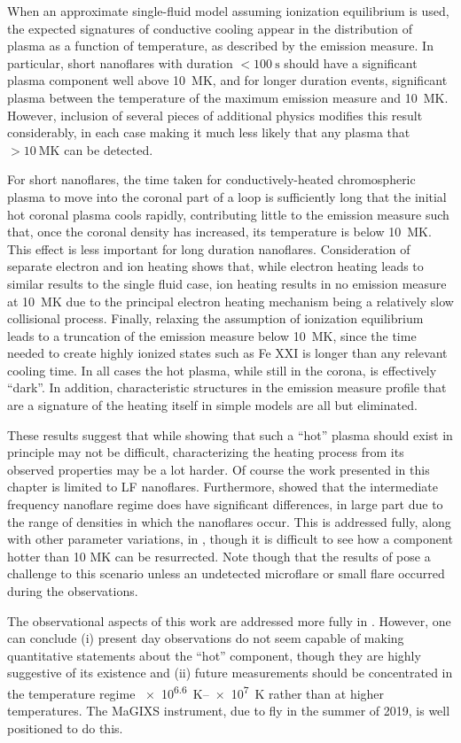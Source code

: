 When an approximate single-fluid model assuming ionization equilibrium is used, the expected signatures of conductive cooling appear in the distribution of plasma as a function of temperature, as described by the emission measure. In particular, short nanoflares with duration $<\SI{100}{\second}$ should have a significant plasma component well above \SI{10}{\mega\kelvin}, and for longer duration events, significant plasma between the temperature of the maximum emission measure and \SI{10}{\mega\kelvin}. However, inclusion of several pieces of additional physics modifies this result considerably, in each case making it much less likely that any plasma that $>\SI{10}{\mega\kelvin}$ can be detected.

For short nanoflares, the time taken for conductively-heated chromospheric plasma to move into the coronal part of a loop is sufficiently long that the initial hot coronal plasma cools rapidly, contributing little to the emission measure such that, once the coronal density has increased, its temperature is below \SI{10}{\mega\kelvin}. This effect is less important for long duration nanoflares. Consideration of separate electron and ion heating shows that, while electron heating leads to similar results to the single fluid case, ion heating results in no emission measure at \SI{10}{\mega\kelvin} due to the principal electron heating mechanism being a relatively slow collisional process. Finally, relaxing the assumption of ionization equilibrium leads to a truncation of the emission measure below \SI{10}{\mega\kelvin}, since the time needed to create highly ionized states such as Fe XXI is longer than any relevant cooling time. In all cases the hot plasma, while still in the corona, is effectively ``dark''. In addition, characteristic structures in the emission measure profile that are a signature of the heating itself in simple models are all but eliminated.

These results suggest that while showing that such a ``hot'' plasma should exist in principle may not be difficult, characterizing the heating process from its observed properties may be a lot harder. Of course the work presented in this chapter is limited to LF nanoflares. Furthermore, \citet{cargill_active_2014} showed that the intermediate frequency nanoflare regime does have significant differences, in large part due to the range of densities in which the nanoflares occur. This is addressed fully, along with other parameter variations, in , though it is difficult to see how a component hotter than 10 MK can be resurrected. Note though that the results of \citet{caspi_new_2015} pose a challenge to this scenario unless an undetected microflare or small flare occurred during the observations.

The observational aspects of this work are addressed more fully in . However, one can conclude (i) present day observations do not seem capable of making quantitative statements about the ``hot'' component, though they are highly suggestive of its existence and (ii) future measurements should be concentrated in the temperature regime \SIrange{e6.6}{e7}{\kelvin} rather than at higher temperatures. The MaGIXS instrument, due to fly in the summer of 2019, is well positioned to do this.
